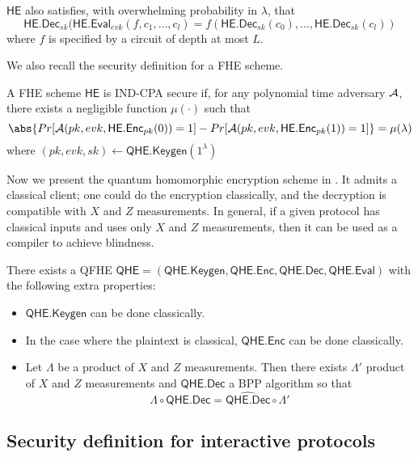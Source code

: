 $\mathsf{HE}$ also satisfies, with overwhelming probability in $\lambda$, that
$$\mathsf{HE.Dec}_{sk}(\mathsf{HE.Eval}_{evk}(f, c_1, \ldots, c_l)=f(\mathsf{HE.Dec}_{sk}(c_0),\ldots,\mathsf{HE.Dec}_{sk}(c_l))$$
where $f$ is specified by a circuit of depth at most $L$.


We also recall the security definition for a FHE scheme.

\begin{dfn}
	A FHE scheme $\mathsf{HE}$ is IND-CPA secure if, for any polynomial time adversary $\mathcal{A}$, there exists a negligible function $\mu(\cdot)$ such that
	$$\abs{Pr[\cA(pk, evk, \mathsf{HE.Enc}_{pk}(0))=1]-Pr[\cA(pk, evk, \mathsf{HE.Enc}_{pk}(1))=1]}=\mu(\lambda)$$
	where $(pk, evk, sk)\leftarrow\mathsf{QHE.Keygen}(1^\lambda)$
\end{dfn}

Now we present the quantum homomorphic encryption scheme in \cite{mahadev_qfhe}.
It admits a classical client; one could do the encryption classically, and the decryption is compatible with $X$ and $Z$ measurements.
In general, if a given protocol has classical inputs and uses only $X$ and $Z$ measurements, then it can be used as a compiler to achieve blindness.

\begin{thm}
	\label{decodeMeasureOrder}
	There exists a QFHE $\mathsf{QHE}=(\mathsf{QHE.Keygen}, \mathsf{QHE.Enc}, \mathsf{QHE.Dec}, \mathsf{QHE.Eval})$ with the following extra properties:
	\begin{itemize}
		\item $\mathsf{QHE.Keygen}$ can be done classically.
		\item In the case where the plaintext is classical, $\mathsf{QHE.Enc}$ can be done classically.
		\item {} Let $\Lambda$ be a product of $X$ and $Z$ measurements. Then there exists $\Lambda'$ product of $X$ and $Z$ measurements and $\widehat{\mathsf{QHE.Dec}}$ a BPP algorithm so that
			$$\Lambda\circ\mathsf{QHE.Dec}=\widehat{\mathsf{QHE.Dec}}\circ\Lambda'$$
	\end{itemize}
\end{thm}

\subsection{Security definition for interactive protocols}

